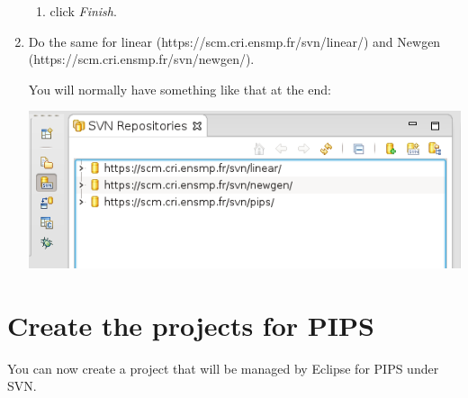 \documentclass[a4paper]{article}
\begin{document}
\begin{enumerate}
\begin{enumerate}
\item click \emph{Finish}.
\end{enumerate}

\item Do the same for linear (https://scm.cri.ensmp.fr/svn/linear/) and Newgen (https://scm.cri.ensmp.fr/svn/newgen/).

You will normally have something like that at the end:
\begin{center}
\noindent
\includegraphics[scale=0.4]{eclipse/02-eclipseJUNO-newRepositories4.png}
\end{center}
\end{enumerate}


\section{Create the projects for PIPS}
\label{sec:makeproject}

You can now create a project that will be managed by Eclipse for PIPS under SVN.
\end{document}
